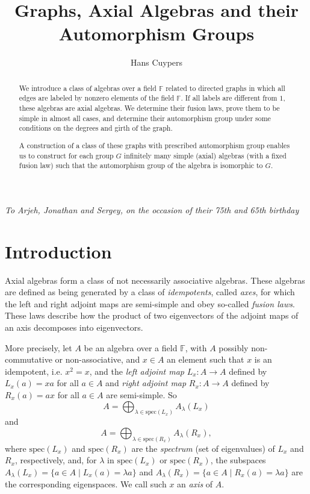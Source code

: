 \documentclass[oneside,a4paper]{amsart} %
\theoremstyle{definition}
\begin{document}
\title{Graphs, Axial Algebras and their Automorphism Groups}
\author{Hans Cuypers} 

\begin{abstract}
We introduce a class of  algebras over a field $\mathbb{F}$ related to directed graphs in which all edges are labeled by nonzero elements of the field $\mathbb{F}$. If all labels are different from $1$, these algebras are axial algebras. 
We determine their fusion laws, prove them to be simple in almost all cases, and determine their automorphism group under some conditions on the degrees and girth of the graph.

A construction of a class of these graphs with prescribed automorphism group enables us to construct  
for each group $G$  infinitely many simple (axial) algebras (with a fixed fusion law) such that the automorphism group of the algebra is isomorphic to $G$.
\end{abstract}

\maketitle

\bigskip

\emph{To Arjeh, Jonathan and Sergey, on the occasion of their 75th and 65th birthday}


\bigskip


\section{Introduction}

Axial algebras form a  class of not necessarily associative algebras.
These algebras are defined as being generated by a class of \emph{idempotents}, called \emph{axes},
for which the left and right adjoint maps are semi-simple and obey so-called \emph{fusion laws}.
These laws describe how the product of two eigenvectors of the adjoint maps of an axis
decomposes into eigenvectors.

More precisely,  let $A$ be an algebra over a field $\mathbb{F}$, with $A$ possibly non-commutative or non-associative, and $x\in A$ an element such that
$x$ is an idempotent, i.e. $x^2=x$, and the \emph{left adjoint map} ${L}_x:A\rightarrow A$ defined by $L_x(a)=xa$ for all $a\in A$ 
and \emph{right adjoint map} $R_x:A\rightarrow A$ defined by $R_x(a)=ax$ for all $a\in A$ are 
semi-simple. So $$A=\bigoplus_{\lambda\in \mathrm{spec}(L_x)} A_\lambda(L_x)$$
and 
$$A=\bigoplus_{\lambda\in \mathrm{spec}(R_x)}A_\lambda(R_x),$$
where $\mathrm{spec}(L_x)$ and $\mathrm{spec}(R_x)$ are  the \emph{spectrum} (set of eigenvalues) of $L_x$ and $R_x$, respectively,  and, for $\lambda$ in $\mathrm{spec}(L_x)$ or $\mathrm{spec}(R_x)$, the subspaces $A_\lambda(L_x )=\{a\in A\mid L_x(a)=\lambda a\}$ and $A_\lambda(R_x )=\{a\in A\mid R_x(a)=\lambda a\}$ are 
the corresponding eigenspaces.
We call such $x$ an \emph{axis} of $A$.
 
\end{document}
